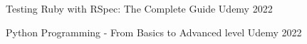 

\begin{cvhonors}

  \cvhonor
    {Testing Ruby with RSpec: The Complete Guide} %
    {Udemy} %
    {} %
    {2022} %

  \cvhonor
    {Python Programming - From Basics to Advanced level} %
    {Udemy} %
    {} %
    {2022} %

\end{cvhonors}
